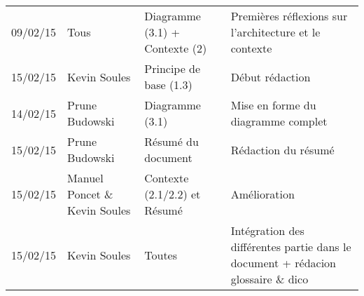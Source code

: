 \small
\begin{tabular}{|p{1.5cm}| >{\raggedright}p{2.9cm}| >{\raggedright}p{3.2cm}|p{7.2cm}|}
  \hline
  \rowcolor{Gainsboro} \color{Navy}{\bfseries Date}  & \color{Navy}{\bfseries Auteur} & \color{Navy}{\bfseries Section(s)}  &\color{Navy}{\bfseries Commentaires} \\
  \hline
  09/02/15 & Tous & Diagramme (3.1) + Contexte (2) & Premières réflexions sur l'architecture et le contexte\\
  \hline
  15/02/15 & Kevin Soules & Principe de base (1.3)  & Début rédaction\\
  \hline
  14/02/15 & Prune Budowski & Diagramme (3.1) & Mise en forme du diagramme complet\\
  \hline
  15/02/15 & Prune Budowski & Résumé du document & Rédaction du résumé\\
  \hline
  15/02/15 & Manuel Poncet \& Kevin Soules & Contexte (2.1/2.2) et Résumé & Amélioration\\
  \hline
  15/02/15 & Kevin Soules & Toutes & Intégration des différentes partie dans le document + rédacion glossaire \& dico\\
  \hline
\end{tabular}
\normalsize
